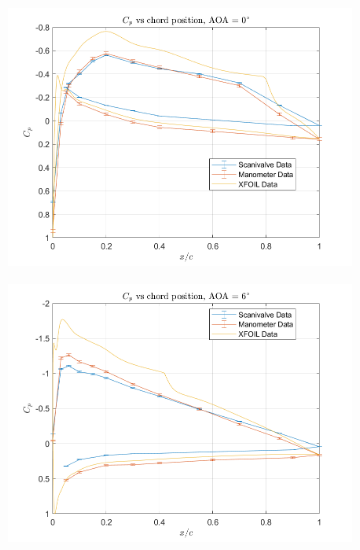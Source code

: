 \documentclass[runningheads]{llncs}
\begin{document}
\begin{figure}[h]
    \centering
    \begin{subfigure}[b]{0.45\textwidth}
         \centering
         \includegraphics[width=\textwidth]{figures/AOA0.png}
         \caption{}
         \label{fig:cp_0}
     \end{subfigure}
     \begin{subfigure}[b]{0.45\textwidth}
         \centering
         \includegraphics[width=\textwidth]{figures/AOA6.png}
         \caption{}
         \label{fig:cp_6}
     \end{subfigure}
     \begin{subfigure}[b]{0.45\textwidth}
         \centering

\end{subfigure}
\end{figure}
\end{document}
